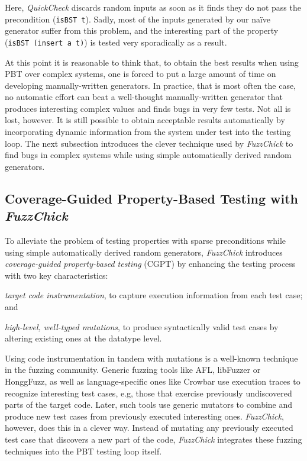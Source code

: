 \documentclass[acmsmall, anonymous]{acmart}
\newcommand{\quickcheck}{\textit{QuickCheck}\xspace}
\newcommand{\fuzzchick}{\textit{FuzzChick}\xspace}
\begin{document}
\noindent Here, \quickcheck discards random inputs as soon as it finds they do
not pass the precondition (\texttt{isBST t}).
%
Sadly, most of the inputs generated by our na\"ive generator suffer from this
problem, and the interesting part of the property (\texttt{isBST (insert a t)})
is tested very sporadically as a result.


At this point it is reasonable to think that, to obtain the best results when
using PBT over complex systems, one is forced to put a large amount of time on
developing manually-written generators.
%
In practice, that is most often the case, no automatic effort can beat a
well-thought manually-written generator that produces interesting complex values
and finds bugs in very few tests.
%
Not all is lost, however.
%
It is still possible to obtain acceptable results automatically by incorporating
dynamic information from the system under test into the testing loop.
%
The next subsection introduces the clever technique used by \fuzzchick to find
bugs in complex systems while using simple automatically derived random
generators.


\subsection{Coverage-Guided Property-Based Testing with \fuzzchick}

To alleviate the problem of testing properties with sparse preconditions while
using simple automatically derived random generators, \fuzzchick introduces
\emph{coverage-guided property-based testing} (CGPT) by enhancing the testing
process with two key characteristics:
%
\begin{inparaenum}
\item \emph{target code instrumentation}, to capture execution information from
  each test case; and
\item \emph{high-level, well-typed mutations}, to produce syntactically valid
  test cases by altering existing ones at the datatype level.
\end{inparaenum}

Using code instrumentation in tandem with mutations is a well-known technique in
the fuzzing community.
%
Generic fuzzing tools like AFL, libFuzzer or HonggFuzz, as well as
language-specific ones like Crowbar use execution traces to recognize
interesting test cases, e.g, those that exercise previously undiscovered parts
of the target code.
%
Later, such tools use generic mutators to combine and produce new test cases
from previously executed interesting ones.
%
\fuzzchick, however, does this in a clever way.
%
Instead of mutating any previously executed test case that discovers a new part
of the code, \fuzzchick integrates these fuzzing techniques into the PBT testing
loop itself.
\end{document}
